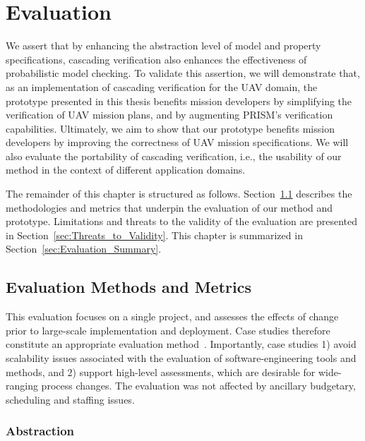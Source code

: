 \chapter{Evaluation}
\label{chap:Evaluation}

We assert that by enhancing the abstraction level of model and property specifications, cascading verification also enhances the effectiveness of probabilistic model checking. To validate this assertion, we will demonstrate that, as an implementation of cascading verification for the UAV domain, the prototype presented in this thesis benefits mission developers by simplifying the verification of UAV mission plans, and by augmenting PRISM's verification capabilities. Ultimately, we aim to show that our prototype benefits mission developers by improving the correctness of UAV mission specifications. We will also evaluate the portability of cascading verification, i.e., the usability of our method in the context of different application domains.

The remainder of this chapter is structured as follows. Section~\ref{sec:Evaluation_Methods_and_Metrics} describes the methodologies and metrics that underpin the evaluation of our method and prototype. Limitations and threats to the validity of the evaluation are presented in Section~\ref{sec:Threats_to_Validity}. This chapter is summarized in Section~\ref{sec:Evaluation_Summary}.

\section{Evaluation Methods and Metrics}
\label{sec:Evaluation_Methods_and_Metrics}

This evaluation focuses on a single project, and assesses the effects of change prior to large-scale implementation and deployment. Case studies therefore constitute an appropriate evaluation method~\cite{Kitchenham_1995}. Importantly, case studies 1) avoid scalability issues associated with the evaluation of software-engineering tools and methods, and 2) support high-level assessments, which are desirable for wide-ranging process changes. The evaluation was not affected by ancillary budgetary, scheduling and staffing issues.

\subsection{Abstraction}

